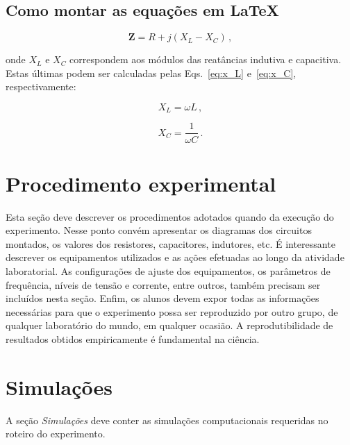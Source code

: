 \documentclass[10pt,twocolumn,letterpaper]{article}
\begin{document}
\subsection{Como montar as equações em \LaTeX}

\begin{equation} \label{eq:imped}
\mathbf{Z} = R + j(X_L - X_C) \, ,
\end{equation}

\noindent
onde $X_L$ e $X_C$ correspondem aos módulos das reatâncias indutiva e capacitiva. Estas últimas podem ser calculadas pelas Eqs.~\eqref{eq:x_L} e~\eqref{eq:x_C}, respectivamente:

\begin{equation} \label{eq:x_L}
X_L = \omega L \, ,
\end{equation}

\begin{equation} \label{eq:x_C}
X_C = \frac{1}{\omega C} \, .
\end{equation} 

\section{Procedimento experimental}

Esta seção deve descrever os procedimentos adotados quando da execução do experimento. Nesse ponto convém apresentar os diagramas dos circuitos montados, os valores dos resistores, capacitores, indutores, etc. É interessante descrever os equipamentos utilizados e as ações efetuadas ao longo da atividade laboratorial. As configurações de ajuste dos equipamentos, os parâmetros de frequência, níveis de tensão e corrente, entre outros, também precisam ser incluídos nesta seção. Enfim, os alunos devem expor todas as informações necessárias para que o experimento possa ser reproduzido por outro grupo, de qualquer laboratório do mundo, em qualquer ocasião. A reprodutibilidade de resultados obtidos empiricamente é fundamental na ciência.

\section{Simulações}

A seção {\em Simulações} deve conter as simulações computacionais requeridas no roteiro do experimento. 
\end{document}

